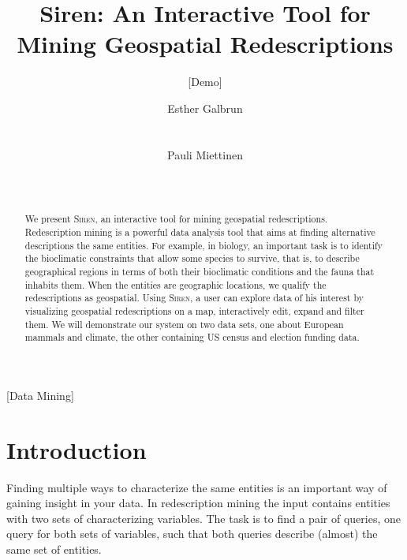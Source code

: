 \documentclass{sig-alternate}
\newcommand{\Siren}{\textsc{Siren}}
\begin{document}
\setlength{\pdfpageheight}{11in}%
\setlength{\pdfpagewidth}{8.5in}%


\title{Siren: An Interactive Tool for Mining Geospatial Redescriptions}
\subtitle{[Demo]}

\author{
\alignauthor
Esther Galbrun\\
       \\
       \\
\alignauthor
Pauli Miettinen\\
       \\
       \\
}

\maketitle
\begin{abstract}
  We present \Siren, an interactive tool for mining geospatial
  redescriptions.  Redescription mining is a powerful data analysis
  tool that aims at finding alternative descriptions the same
  entities.  For example, in biology, an important task is to identify
  the bioclimatic constraints that allow some species to survive, that
  is, to describe geographical regions in terms of both their
  bioclimatic conditions and the fauna that inhabits them.  When the
  entities are geographic locations, we qualify the redescriptions as
  geospatial.  Using \textsc{Siren}, a user can explore data of his
  interest by visualizing geospatial redescriptions on a map,
  interactively edit, expand and filter them.  We will demonstrate our
  system on two data sets, one about European mammals and climate, the
  other containing US census and election funding data.
\end{abstract}

[Data Mining]



\section{Introduction}
Finding multiple ways to characterize the same entities is an important way of gaining insight in your data.
In
redescription mining the input contains entities with two sets of
characterizing variables. The task is to find a pair of queries, one
query for both sets of variables, such that both queries describe
(almost) the same set of entities.
\end{document}

